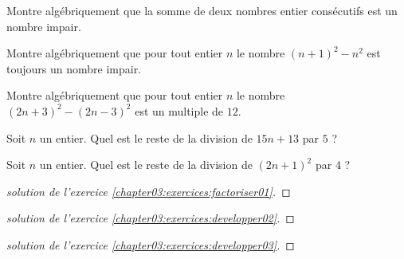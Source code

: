 \documentclass[main.tex]{subfiles}
\begin{document}
\begin{exercise}\hfill 
	
\noindent Montre algébriquement que la somme de deux nombres entier consécutifs est un nombre impair. 
\end{exercise}
\begin{exercise}\hfill 

\noindent Montre algébriquement que pour tout entier $n$ le nombre $(n+1)^2-n^2$ est toujours un nombre impair.
\end{exercise}
%	
%	
\begin{exercise}\hfill 
	
\noindent Montre algébriquement que pour tout entier $n$ le nombre $(2n+3)^2-(2n-3)^2$ est un multiple de $12$.
\end{exercise} 
\begin{exercise} \hfill 
	
	Soit $n$ un entier. Quel est le reste de la division de $15n+13$ par $5$ ?
\end{exercise}
\begin{exercise}\hfill
	
	Soit $n$ un entier.  Quel est le reste de la division de $(2n+1)^2$ par $4$ ?
\end{exercise}

%	 
\newpage 
\begin{proof}[solution de l'exercice \ref{chapter03:exercices:factoriser01}]
	
\end{proof}
\begin{proof}[solution de l'exercice \ref{chapter03:exercices:developper02}]
	
\end{proof}
\begin{proof}[solution de l'exercice \ref{chapter03:exercices:developper03}]

\end{proof}
\end{document}
